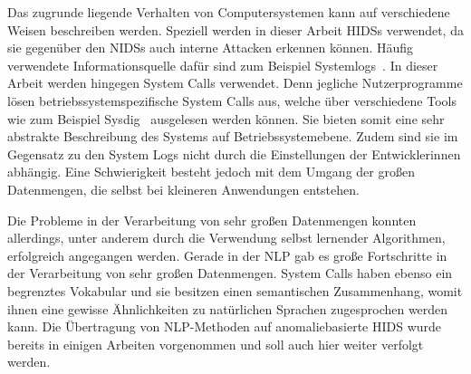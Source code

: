 

%


Das zugrunde liegende Verhalten von Computersystemen kann auf verschiedene Weisen beschreiben werden.
Speziell werden in dieser Arbeit \acfp{HIDS} verwendet, da sie gegenüber den \acp{NIDS} auch interne Attacken erkennen können.
Häufig verwendete Informationsquelle dafür sind zum Beispiel Systemlogs~\cite{HE}.
In dieser Arbeit werden hingegen System Calls verwendet.
Denn jegliche Nutzerprogramme lösen betriebssystemspezifische System Calls aus, welche über verschiedene Tools wie zum Beispiel Sysdig~\cite{SYSDIG} ausgelesen werden können.
Sie bieten somit eine sehr abstrakte Beschreibung des Systems auf Betriebssystemebene.
Zudem sind sie im Gegensatz zu den System Logs nicht durch die Einstellungen der Entwicklerinnen abhängig.
Eine Schwierigkeit besteht jedoch mit dem Umgang der großen Datenmengen, die selbst bei kleineren Anwendungen entstehen.\par\medskip

Die Probleme in der Verarbeitung von sehr großen Datenmengen konnten allerdings, unter anderem durch die Verwendung selbst lernender Algorithmen, erfolgreich angegangen werden.
Gerade in der \acf{NLP} gab es große Fortschritte in der Verarbeitung von sehr großen Datenmengen.
System Calls haben ebenso ein begrenztes Vokabular und sie besitzen einen semantischen Zusammenhang, womit ihnen eine gewisse Ähnlichkeiten zu natürlichen Sprachen zugesprochen werden kann.
Die Übertragung von \ac{NLP}-Methoden auf anomaliebasierte \ac{HIDS} wurde bereits in einigen Arbeiten vorgenommen und soll auch hier weiter verfolgt werden.\par\medskip

